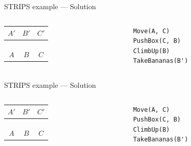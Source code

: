 \begin{frame}[fragile]{STRIPS example --- Solution}
	\begin{columns}
		\begin{column}{0.4\textwidth}
			\begin{tabular}{c|c|c}
				  $A'$  &   $B'$  &   $C'$  \\\hline
				\emptyy & \banana & \emptyy \\
				\emptyy & \emptyy & \emptyy \\
				\emptyy & \emptyy & \boxbox\monkey \\\hline
				  $A$   &   $B$   &    $C$
			\end{tabular}
		\end{column}
		\begin{column}{0.58\textwidth}
			\begin{lstlisting}
Move(A, C)
PushBox(C, B)
ClimbUp(B)
TakeBananas(B')
			\end{lstlisting}
		\end{column}
	\end{columns}
\end{frame}

\begin{frame}[fragile]{STRIPS example --- Solution}
	\begin{columns}
		\begin{column}{0.4\textwidth}
			\begin{tabular}{c|c|c}
				  $A'$  &   $B'$  &   $C'$  \\\hline
				\emptyy & \banana & \emptyy \\
				\emptyy & \emptyy & \emptyy \\
				\emptyy & \boxbox\monkey & \emptyy \\\hline
				  $A$   &   $B$   &    $C$
			\end{tabular}
		\end{column}
		\begin{column}{0.58\textwidth}
			\begin{lstlisting}
Move(A, C)
PushBox(C, B)
ClimbUp(B)
TakeBananas(B')
			\end{lstlisting}
		\end{column}
	\end{columns}
\end{frame}


